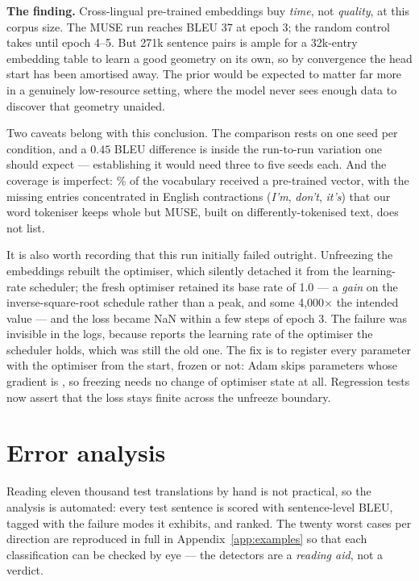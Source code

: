 \documentclass[11pt,a4paper]{article}
\begin{document}
\begin{keypoint}
\textbf{The finding.} Cross-lingual pre-trained embeddings buy \emph{time}, not
\emph{quality}, at this corpus size. The MUSE run reaches BLEU 37 at epoch 3;
the random control takes until epoch 4--5. But 271k sentence pairs is ample for
a 32k-entry embedding table to learn a good geometry on its own, so by
convergence the head start has been amortised away. The prior would be expected
to matter far more in a genuinely low-resource setting, where the model never
sees enough data to discover that geometry unaided.
\end{keypoint}

Two caveats belong with this conclusion. The comparison rests on one seed per
condition, and a $0.45$ BLEU difference is inside the run-to-run variation one
should expect --- establishing it would need three to five seeds each. And the
coverage is imperfect: \MuseCoveragePercent\% of the vocabulary received a
pre-trained vector, with the missing \MuseRandom{} entries concentrated in
English contractions (\emph{I'm}, \emph{don't}, \emph{it's}) that our word
tokeniser keeps whole but MUSE, built on differently-tokenised text, does not
list.

It is also worth recording that this run initially failed outright. Unfreezing
the embeddings rebuilt the optimiser, which silently detached it from the
learning-rate scheduler; the fresh optimiser retained its base rate of 1.0 --- a
\emph{gain} on the inverse-square-root schedule rather than a peak, and some
4{,}000$\times$ the intended value --- and the loss became NaN within a few
steps of epoch 3. The failure was invisible in the logs, because
 reports the learning rate of the optimiser the scheduler
holds, which was still the old one. The fix is to register every parameter with
the optimiser from the start, frozen or not: Adam skips parameters whose
gradient is , so freezing needs no change of optimiser state at all.
Regression tests now assert that the loss stays finite across the unfreeze
boundary.

\section{Error analysis}
\label{sec:errors}

Reading eleven thousand test translations by hand is not practical, so the
analysis is automated: every test sentence is scored with sentence-level BLEU,
tagged with the failure modes it exhibits, and ranked. The twenty worst cases
per direction are reproduced in full in Appendix~\ref{app:examples} so that
each classification can be checked by eye --- the detectors are a \emph{reading
aid}, not a verdict.
\end{document}

